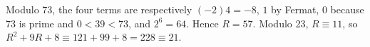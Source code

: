 Modulo 73, the four terms are respectively $(-2)4=-8$, $1$ by Fermat, $0$ because 73 is prime and $0<39<73$, and $2^6=64$. Hence $R=57$. Modulo 23, $R\equiv11$, so $R^2+9R+8\equiv121+99+8=228\equiv\boxed{21}$.

